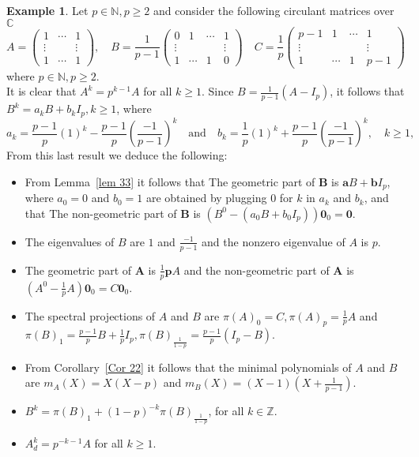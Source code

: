 \documentclass[12pt]{amsart}
\theoremstyle{definition}
\newtheorem{example}[thrm]{Example}
\numberwithin{equation}{section}
\numberwithin{equation}{section}
\begin{document}
\begin{example} Let $p\in \mathbb{N}, p\geqslant 2$ and consider the following circulant matrices over $\mathbb{C}$
$$A=\begin{pmatrix}
1&\cdots&1\\
\vdots&&\vdots\\
1&\cdots&1
\end{pmatrix},
\quad B=\frac{1}{p-1}\begin{pmatrix}
0&1&\cdots&1\\
\vdots&&&\vdots\\
1&\cdots&1&0
\end{pmatrix}
\quad C=\frac{1}{p}\begin{pmatrix}
p-1&1&\cdots&1\\
\vdots&&&\vdots\\
1&\cdots&1&p-1
\end{pmatrix}
$$
where $p\in \mathbb{N}, p\geqslant 2$.
\\It is clear that $A^{k}=p^{k-1}A$ for all $k\geqslant 1$. Since $B=\frac{1}{p-1}(A-I_{p})$, it follows that $B^{k}=a_{k}B+b_{k}I_{p}, k\geqslant 1$, where $$a_{k}=\frac{p-1}{p}(1)^{k}-\frac{p-1}{p}\left(\frac{-1}{p-1}\right)^{k} \quad\text{and}\quad b_{k}=\frac{1}{p}(1)^{k}+\frac{p-1}{p}\left(\frac{-1}{p-1}\right)^{k},\quad k\geqslant 1,$$
From this last result we deduce the following:
\begin{itemize}
\item From Lemma~\ref{lem 33} it follows that The geometric part of $\pmb{B}$ is $\pmb{a}B+\pmb{b}I_{p}$, where $a_{0}=0$ and $b_{0}=1$ are obtained by plugging $0$ for $k$ in $a_{k}$ and $b_{k}$, and that The non-geometric part of $\pmb{B}$ is $(B^{0}-(a_{0}B+b_{0}I_{p}))\pmb{0}_{0}=\pmb{0}$.
\item The eigenvalues of $B$ are $1$ and $\displaystyle\frac{-1}{p-1}$ and the nonzero eigenvalue of $A$ is $p$.
\item The geometric part of $\pmb{A}$ is $\displaystyle\frac{1}{p}\pmb{p}A$ and the non-geometric part of $\pmb{A}$ is $\displaystyle(A^{0}-\frac{1}{p}A)\pmb{0}_{0}=C\pmb{0}_{0}$.
\item The spectral projections of $A$ and $B$ are $\pi(A)_{0}=C, \pi(A)_{p}=\displaystyle\frac{1}{p}A$ and $\pi(B)_{1}=\displaystyle\frac{p-1}{p}B+\frac{1}{p}I_{p}, \pi(B)_{\frac{1}{1-p}}=\displaystyle\frac{p-1}{p}(I_{p}-B)$.
\item From Corollary~\ref{Cor 22} it follows that the minimal polynomials of $A$ and $B$ are $m_{A}(X)=X(X-p)$ and $m_{B}(X)=\displaystyle(X-1)(X+\frac{1}{p-1})$.
    \item $B^{k}=\pi(B)_{1}+(1-p)^{-k}\pi(B)_{\frac{1}{1-p}}$, for all $k\in \mathbb{Z}$.
    \item $A_{d}^{k}=p^{-k-1}A$ for all $k\geqslant 1$.
\end{itemize}
\end{example}
\end{document}
